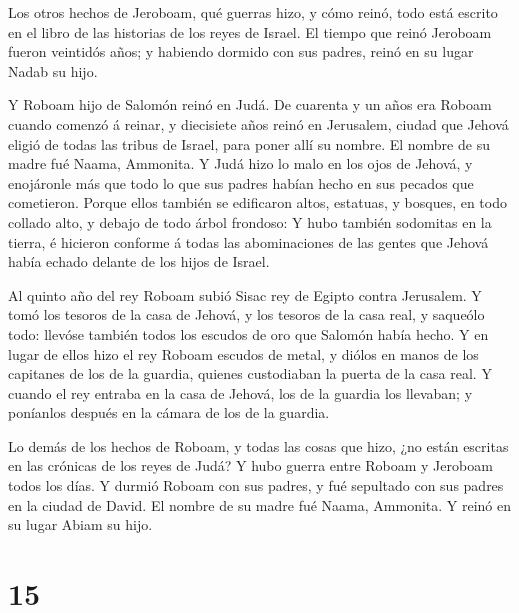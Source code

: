  Los otros hechos de Jeroboam, qué guerras hizo, y cómo
reinó, todo está escrito en el libro de las historias de los reyes de
Israel.  El tiempo que reinó Jeroboam fueron veintidós
años; y habiendo dormido con sus padres, reinó en su lugar Nadab su
hijo.

 Y Roboam hijo de Salomón reinó en Judá. De cuarenta y un
años era Roboam cuando comenzó á reinar, y diecisiete años reinó en
Jerusalem, ciudad que Jehová eligió de todas las tribus de Israel, para
poner allí su nombre. El nombre de su madre fué Naama, Ammonita.
 Y Judá hizo lo malo en los ojos de Jehová, y enojáronle
más que todo lo que sus padres habían hecho en sus pecados que
cometieron.  Porque ellos también se edificaron altos,
estatuas, y bosques, en todo collado alto, y debajo de todo árbol
frondoso:  Y hubo también sodomitas en la tierra, é
hicieron conforme á todas las abominaciones de las gentes que Jehová
había echado delante de los hijos de Israel.

 Al quinto año del rey Roboam subió Sisac rey de Egipto
contra Jerusalem.  Y tomó los tesoros de la casa de Jehová,
y los tesoros de la casa real, y saqueólo todo: llevóse también todos
los escudos de oro que Salomón había hecho.  Y en lugar de
ellos hizo el rey Roboam escudos de metal, y diólos en manos de los
capitanes de los de la guardia, quienes custodiaban la puerta de la casa
real.  Y cuando el rey entraba en la casa de Jehová, los de
la guardia los llevaban; y poníanlos después en la cámara de los de la
guardia.

 Lo demás de los hechos de Roboam, y todas las cosas que
hizo, ¿no están escritas en las crónicas de los reyes de Judá?
 Y hubo guerra entre Roboam y Jeroboam todos los días.
 Y durmió Roboam con sus padres, y fué sepultado con sus
padres en la ciudad de David. El nombre de su madre fué Naama, Ammonita.
Y reinó en su lugar Abiam su hijo.

\hypertarget{section-14}{%
\section{15}\label{section-14}}

